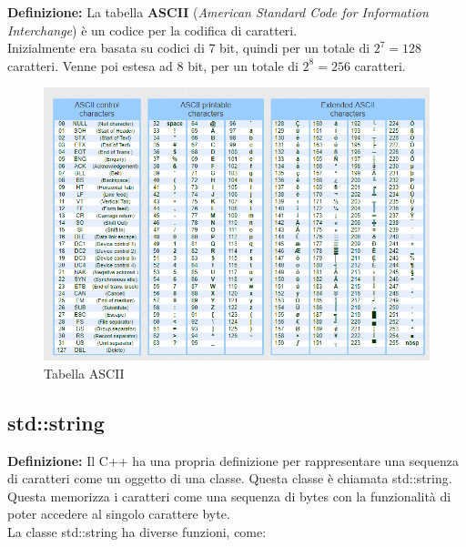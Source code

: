 \textsf{\small \textbf{Definizione: } La tabella \textbf{ASCII} (\emph{American Standard Code for Information Interchange}) è un codice per la codifica di caratteri.} \\

\textsf{\small Inizialmente era basata su codici di 7 bit, quindi per un totale di $2^7 = 128$ caratteri. Venne poi estesa ad 8 bit, per un totale di $2^8 = 256$ caratteri.} \\

\begin{figure}[ht]
	\centering
	\includegraphics[width=1\textwidth, height=1\textheight, keepaspectratio]{./imgs/ascii_table2.png}
	\caption{Tabella ASCII}
	\label{fig:ascii_table}
\end{figure}

\subsection{std::string}

\textsf{\small \textbf{Definizione: } Il C++ ha una propria definizione per rappresentare una sequenza di caratteri come un oggetto di una classe. Questa classe è chiamata std::string. Questa memorizza i caratteri come una sequenza di bytes con la funzionalità di poter accedere al singolo carattere byte.} \\

\textsf{\small La classe std::string ha diverse funzioni, come: } 

